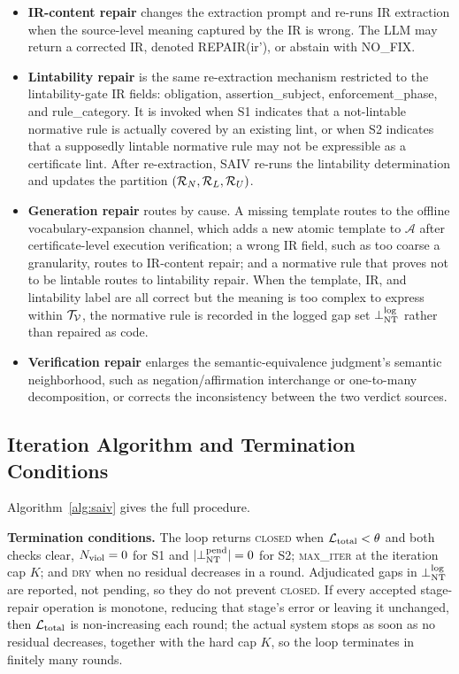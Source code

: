\begin{itemize}
\item \textbf{IR-content repair} changes the extraction prompt
  and re-runs IR extraction when the source-level meaning captured by the IR is
  wrong. The LLM may return a corrected IR, denoted REPAIR(ir'), or
  abstain with NO\_FIX.
\item \textbf{Lintability repair} is the same re-extraction
  mechanism restricted to the lintability-gate IR fields: obligation,
  assertion\_subject, enforcement\_phase, and rule\_category. It is invoked when
  S1 indicates that a not-lintable normative rule is actually covered by an existing lint,
  or when S2 indicates that a supposedly lintable normative rule may not be expressible as
  a certificate lint. After re-extraction, SAIV re-runs the lintability
  determination and updates the partition $(\mathcal{R}_N, \mathcal{R}_L, \mathcal{R}_U)$.
\item \textbf{Generation repair} routes by cause. A missing template routes to the
  offline vocabulary-expansion channel, which adds a new atomic
  template to $\mathcal{A}$ after certificate-level execution verification; a wrong IR field, such as too coarse a granularity,
  routes to IR-content repair; and a normative rule that proves not to be lintable
  routes to lintability repair. When the template, IR, and
  lintability label are all correct but the meaning is too complex to express
  within $\mathcal{T}_{\mathcal{V}}$, the normative rule is recorded in the logged gap set $\bot_{\mathrm{NT}}^{\mathrm{log}}$
  rather than repaired as code.
\item \textbf{Verification repair} enlarges the semantic-equivalence
  judgment's semantic neighborhood, such as negation/affirmation interchange or
  one-to-many decomposition, or corrects the inconsistency between the two
  verdict sources.
\end{itemize}

\subsection{Iteration Algorithm and Termination Conditions}
\label{subsec:algo}

Algorithm~\ref{alg:saiv} gives the full procedure.



\textbf{Termination conditions.} The loop returns \textsc{closed} when
$\mathcal{L}_{\mathrm{total}} < \theta$ and both checks clear, $N_{\mathrm{viol}} = 0$ for S1 and
$|\bot_{\mathrm{NT}}^{\mathrm{pend}}| = 0$ for S2; \textsc{max\_iter} at the iteration cap $K$; and
\textsc{dry} when no residual decreases in a round. Adjudicated gaps in $\bot_{\mathrm{NT}}^{\mathrm{log}}$
are reported, not pending, so they do not prevent \textsc{closed}. If every
accepted stage-repair operation is monotone, reducing that stage's error or
leaving it unchanged, then $\mathcal{L}_{\mathrm{total}}$ is non-increasing each round; the actual
system stops as soon as no residual decreases, together with the hard cap $K$,
so the loop terminates in finitely many rounds.
